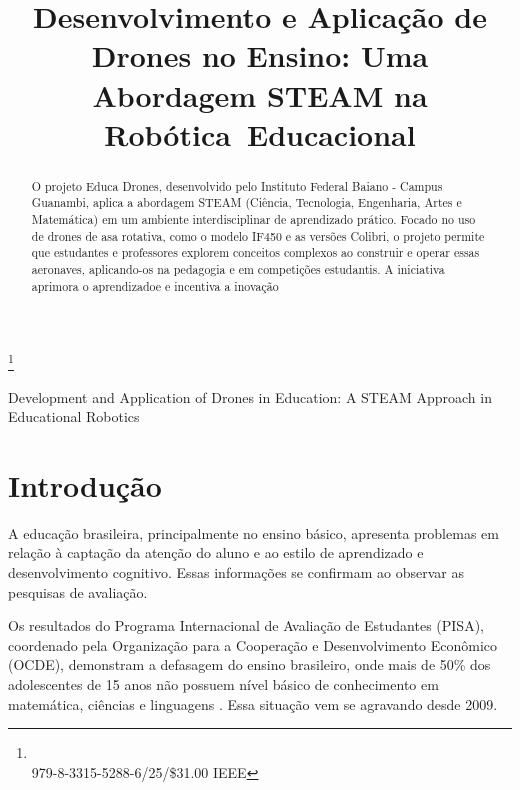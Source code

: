 \documentclass[conference]{IEEEtran}
\begin{document}
\title{Desenvolvimento e Aplicação de Drones no Ensino: Uma Abordagem STEAM na Robótica Educacional}


\maketitle
\let\thefootnote\relax\footnote{\\979-8-3315-5288-6/25/\$31.00 IEEE}

\begin{abstract}
O projeto Educa Drones, desenvolvido pelo Instituto Federal Baiano - Campus Guanambi, aplica a abordagem STEAM (Ciência, Tecnologia, Engenharia, Artes e Matemática) em um ambiente interdisciplinar de aprendizado prático. Focado no uso de drones de asa rotativa, como o modelo IF450 e as versões Colibri, o projeto permite que estudantes e professores explorem conceitos complexos ao construir e operar essas aeronaves, aplicando-os na pedagogia e em competições estudantis. A iniciativa aprimora o aprendizadoe e incentiva a inovação
\end{abstract}

\begin{IEEEkeywords}
Development and Application of Drones in Education: A STEAM Approach in Educational Robotics
\end{IEEEkeywords}

\section{Introdução}

A educação brasileira, principalmente no ensino básico, apresenta problemas em relação à captação da atenção do aluno e ao estilo de aprendizado e desenvolvimento cognitivo. Essas informações se confirmam ao observar as pesquisas de avaliação.

Os resultados do Programa Internacional de Avaliação de Estudantes (PISA), coordenado pela Organização para a Cooperação e Desenvolvimento Econômico (OCDE), demonstram a defasagem do ensino brasileiro, onde mais de 50\% dos adolescentes de 15 anos não possuem nível básico de conhecimento em matemática, ciências e linguagens \cite{b6}. Essa situação vem se agravando desde 2009.
\end{document}
